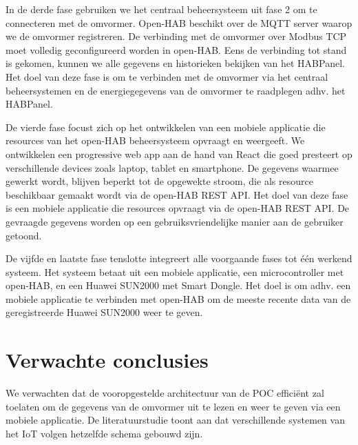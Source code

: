 \documentclass{hogent-article}
\begin{document}
    In de derde fase gebruiken we het centraal beheersysteem uit fase 2 om te connecteren met de omvormer. Open-HAB beschikt over de MQTT server waarop we de omvormer registreren. De verbinding met de omvormer over Modbus TCP moet volledig geconfigureerd worden in open-HAB. Eens de verbinding tot stand is gekomen, kunnen we alle gegevens en historieken bekijken van het HABPanel. Het doel van deze fase is om te verbinden met de omvormer via het centraal beheersystemen en de energiegegevens van de omvormer te raadplegen adhv. het HABPanel.
    
    De vierde fase focust zich op het ontwikkelen van een mobiele applicatie die resources van het open-HAB beheersysteem opvraagt en weergeeft. We ontwikkelen een progressive web app aan de hand van React die goed presteert op verschillende devices zoals laptop, tablet en smartphone. De gegevens waarmee gewerkt wordt, blijven beperkt tot de opgewekte stroom, die als resource beschikbaar gemaakt wordt via de open-HAB REST API. Het doel van deze fase is een mobiele applicatie die resources opvraagt via de open-HAB REST API. De gevraagde gegevens worden op een gebruiksvriendelijke manier aan de gebruiker getoond.
    
    De vijfde en laatste fase tenslotte integreert alle voorgaande fases tot één werkend systeem. Het systeem betaat uit een mobiele applicatie, een microcontroller met open-HAB, en een Huawei SUN2000 met Smart Dongle. Het doel is om adhv. een mobiele applicatie te verbinden met open-HAB om de meeste recente data van de geregistreerde Huawei SUN2000 weer te geven.
    
    \section{Verwachte conclusies}
    
    
    We verwachten dat de vooropgestelde architectuur van de POC efficiënt zal toelaten om de gegevens van de omvormer uit te lezen en weer te geven via een mobiele applicatie. De literatuurstudie toont aan dat verschillende systemen van het IoT volgen hetzelfde schema gebouwd zijn.
    
\end{document}
